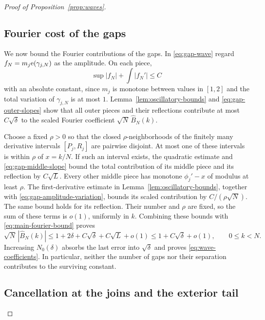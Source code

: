 \begin{proof}[Proof of Proposition~\ref{prop:waves}]
\subsection*{Fourier cost of the gaps}

We now bound the Fourier contributions of the gaps.  In
\eqref{eq:gap-wave} regard $f_N=m_j\mathrm e(\gamma_{j,N})$ as the amplitude.
On each piece,
\begin{equation}\label{eq:gap-amplitude-variation}
 \sup|f_N|+\int|f_N'|\le C
\end{equation}
with an absolute constant, since $m_j$ is monotone between values in
$[1,2]$ and the total variation of $\gamma_{j,N}$ is at most $1$.
Lemma~\ref{lem:oscillatory-bounds} and
\eqref{eq:gap-outer-slopes} show that all outer pieces and their
reflections contribute at most $C\sqrt\delta$ to the scaled Fourier
coefficient $\sqrt N\,\widehat B_N(k)$.

Choose a fixed $\rho>0$ so that the closed $\rho$-neighborhoods of the
finitely many derivative intervals $[P_j,R_j]$ are pairwise disjoint.
At most one of these intervals is within $\rho$ of $x=k/N$.  If such an
interval exists, the quadratic estimate and \eqref{eq:gap-middle-slope}
bound the total contribution of its middle piece and its reflection by
$C\sqrt L$.
Every other middle piece has monotone $\phi_j'-x$ of modulus at least
$\rho$.  The first-derivative estimate in
Lemma~\ref{lem:oscillatory-bounds}, together with
\eqref{eq:gap-amplitude-variation}, bounds its scaled contribution by
$C/(\rho\sqrt N)$.  The same bound holds for its reflection.  Their
number and $\rho$ are fixed, so the sum of these terms is $o(1)$,
uniformly in $k$.  Combining these bounds with
\eqref{eq:main-fourier-bound} proves
\[
 \sqrt N\,|\widehat B_N(k)|
 \le1+2\delta+C\sqrt\delta+C\sqrt L+o(1)
 \le1+C\sqrt\delta+o(1),\qquad 0\le k<N.
\]
Increasing $N_0(\delta)$ absorbs the last error into $\sqrt\delta$ and
proves \eqref{eq:wave-coefficients}.  In particular, neither the number
of gaps nor their separation contributes to the surviving constant.

\subsection*{Cancellation at the joins and the exterior tail}


\end{proof}
